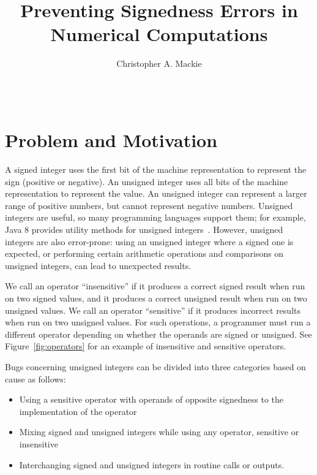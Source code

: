 \documentclass{sig-alternate-05-2015}
\begin{document}
\setlength{\pdfpageheight}{\paperheight}
\setlength{\pdfpagewidth}{\paperwidth}

\title{Preventing Signedness Errors in Numerical Computations}

\author{
Christopher A. Mackie\\
       \\
       \\
}

\maketitle

\section{Problem and Motivation}

A signed integer uses the first bit of the machine representation to
represent the sign (positive or negative).  An unsigned integer uses all
bits of the machine representation to represent the value.
An unsigned integer can represent a larger range of positive numbers, but
cannot represent negative numbers.
Unsigned integers are useful, so many programming languages support them;
for example, Java 8 provides utility methods for unsigned
integers~\cite{JDK8UnsignedIntegerArithmetic2012}.  However, unsigned
integers are also error-prone:  using an unsigned integer where a signed
one is expected, or performing certain arithmetic operations and
comparisons on unsigned integers, can lead to unexpected results.

We call an operator ``insensitive'' if it produces a correct signed result
when run on two signed values, and it produces a correct unsigned result
when run on two unsigned values.  We call an operator ``sensitive'' if it
produces incorrect results when run on two unsigned values.  For such
operations, a programmer must run a different operator depending on whether
the operands are signed or unsigned.  See Figure~\ref{fig:operators} for
an example of insensitive and sensitive operators.

Bugs concerning unsigned integers can be divided into three categories based on cause as follows:

\begin{itemize}\itemsep 0pt \parskip 0pt
  \item Using a sensitive operator with operands of opposite signedness to the implementation of the operator
  \item Mixing signed and unsigned integers while using any operator, sensitive or insensitive
  \item Interchanging signed and unsigned integers in routine calls or outputs.
\end{itemize}
\end{document}
